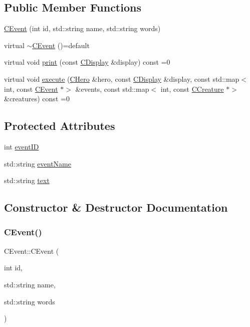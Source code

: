 \subsection*{Public Member Functions}
\begin{DoxyCompactItemize}
\item 
\mbox{\hyperlink{class_c_event_a1adde3f0aa3a249b5ebd96d8b58f25d9}{C\+Event}} (int id, std\+::string name, std\+::string words)
\item 
virtual \mbox{\hyperlink{class_c_event_a6e20daa780afcb3927b14649d70364c7}{$\sim$\+C\+Event}} ()=default
\item 
virtual void \mbox{\hyperlink{class_c_event_ad6f75aa0babcd74caff9426cecdd86f0}{print}} (const \mbox{\hyperlink{class_c_display}{C\+Display}} \&display) const =0
\item 
virtual void \mbox{\hyperlink{class_c_event_a46bd2925f7f19c5c0d6adf2b1e6e3f70}{execute}} (\mbox{\hyperlink{class_c_hero}{C\+Hero}} \&hero, const \mbox{\hyperlink{class_c_display}{C\+Display}} \&display, const std\+::map$<$ int, const \mbox{\hyperlink{class_c_event}{C\+Event}} $\ast$$>$ \&events, const std\+::map$<$ int, const \mbox{\hyperlink{class_c_creature}{C\+Creature}} $\ast$$>$ \&creatures) const =0
\end{DoxyCompactItemize}
\subsection*{Protected Attributes}
\begin{DoxyCompactItemize}
\item 
int \mbox{\hyperlink{class_c_event_a606d5ce523c07656aae583232d496052}{event\+ID}}
\item 
std\+::string \mbox{\hyperlink{class_c_event_a656665a83f6b4ab7756235588f2017e3}{event\+Name}}
\item 
std\+::string \mbox{\hyperlink{class_c_event_a0126916c81d39bf5a4bcd18da90b7c61}{text}}
\end{DoxyCompactItemize}


\subsection{Constructor \& Destructor Documentation}
\mbox{\label{class_c_event_a1adde3f0aa3a249b5ebd96d8b58f25d9}} 
\subsubsection{\texorpdfstring{C\+Event()}{CEvent()}}
{\footnotesize\ttfamily C\+Event\+::\+C\+Event (\begin{DoxyParamCaption}\item[{int}]{id,  }\item[{std\+::string}]{name,  }\item[{std\+::string}]{words }\end{DoxyParamCaption})\hspace{0.3cm}{\ttfamily [inline]}}

